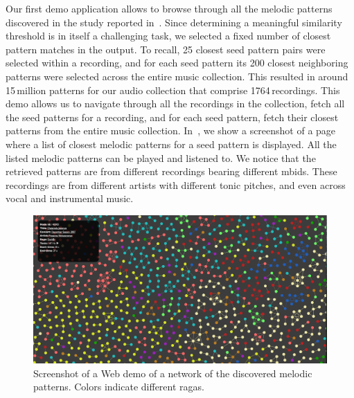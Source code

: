 Our first demo application allows to browse through all the melodic patterns discovered in the study reported in~\secref{}. Since determining a meaningful similarity threshold is in itself a challenging task, we selected a fixed number of closest pattern matches in the output. To recall, 25 closest seed pattern pairs were selected within a recording, and for each seed pattern its 200 closest neighboring patterns were selected  across the entire music collection. This resulted in around 15\,million patterns for our audio collection that comprise 1764\,recordings. This demo allows us to navigate through all the recordings in the collection, fetch all the seed patterns for a recording, and for each seed pattern, fetch their closest patterns from the entire music collection. In~, we show a screenshot of a page where a list of closest melodic patterns for a seed pattern is displayed. All the listed melodic patterns can be played and listened to. We notice that the retrieved patterns are from different recordings bearing different \glspl{mbid}. These recordings are from different artists with different tonic pitches, and even across vocal and instrumental music. 

\begin{figure}
	\begin{center}
		\includegraphics[width=\figSizeHundred]{ch08_applications/figures/patternNetwork1.png}
	\end{center}
	\caption{Screenshot of a Web demo of a network of the discovered melodic patterns. Colors indicate different \glspl{raga}.}
	\label{fig:network_patterns}
\end{figure}

